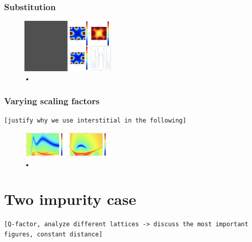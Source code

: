 \documentclass[aps,pra,superscriptaddress,twocolumn]{revtex4-1}
\newcommand{\commentSO}[1]{\texttt{\color{orange}[#1]}}
\begin{document}
\subsubsection{Substitution}

\begin{figure}
    \centering
    \includegraphics[width=0.4\textwidth]{figures/mono_rect_plaquettes_substitution.png} 
    \caption{•}
    \label{fig:mono_rect_plaquette_substitution}
\end{figure}

\subsubsection{Varying scaling factors}
\commentSO{justify why we use interstitial in the following}

\begin{figure}
    \centering
    \includegraphics[width=0.4\textwidth]{figures/mono_rect_thetadelta.png} 
    \caption{•}
    \label{fig:mono_rect_thetadelta}
\end{figure}


\section{Two impurity case}
\commentSO{Q-factor, analyze different lattices -> discuss the most important figures, constant distance}
\end{document}
